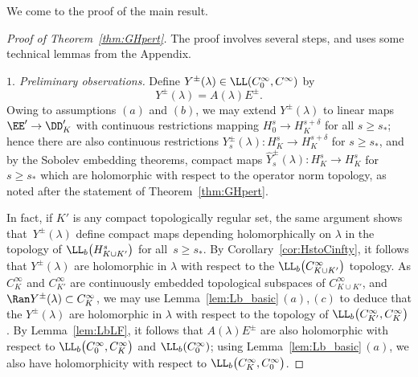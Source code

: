 We come to the proof of the main result.
 \begin{proof}[Proof of Theorem~\ref{thm:GHpert}] The proof involves several steps, and uses some technical lemmas from the Appendix.
 	
 	\emph{$1.$ Preliminary observations.} Define $Y^\pm(\lambda)\in\LL(C_0^\infty,C^\infty)$ by
 	\begin{equation*}
 		Y^\pm(\lambda)=A(\lambda)E^\pm.
 	\end{equation*}
 	Owing to assumptions $(a)$ and $(b)$, we may extend $Y^\pm(\lambda)$ to linear maps $\EE'\to\DD'_K$ with continuous restrictions mapping $H^s_0\to H^{s+\delta}_K$ for all $s\ge s_*$; hence there are also continuous restrictions $Y_s^\pm(\lambda)\colon H^s_K\to H^{s+\delta}_K$ for $s\ge s_*$,
 	and by the Sobolev embedding theorems, compact maps $\hat{Y}^\pm_s(\lambda)\colon H^s_K\to H^{s}_K$ for $s\ge s_*$ which are holomorphic with respect to the operator norm topology, as noted after the statement of Theorem~\ref{thm:GHpert}.
 	
 	In fact, if $K'$ is any compact topologically regular set, the same argument shows that~$Y^\pm(\lambda)$
 define compact maps depending holomorphically on $\lambda$ in the topology of
 	$\LL_b\big(H^s_{K\cup K'}\big)$ for all~${s\!\ge\!s_*}$. By Corollary~\ref{cor:HstoCinfty}, it follows that
 	$Y^\pm(\lambda)$ are holomorphic in $\lambda$ with respect to the $\LL_b\big(C^\infty_{K\cup K'}\big)$ topology.
 	As $C^\infty_K$ and $C^\infty_{K'}$ are continuously embedded topological subspaces of $C^\infty_{K\cup K'}$, and $\Ran Y^\pm(\lambda)\subset C^\infty_K$, we may use Lemma~\ref{lem:Lb_basic}\,$(a)$,\,$(c)$ to deduce that
 	the $Y^\pm(\lambda)$ are holomorphic in $\lambda$ with respect to the
 	topology of $\LL_b\big(C^\infty_{K'},C^\infty_{K}\big)$.
 	By Lemma~\ref{lem:LbLF}, it follows that
 	$A(\lambda)E^\pm$ are also holomorphic with respect to $\LL_b\big(C_0^\infty,C^\infty_K\big)$ and $\LL_b(C_0^\infty)$; using Lemma~\ref{lem:Lb_basic}\,$(a)$, we also have holomorphicity with respect to
 	$\LL_b\big(C^\infty_K,C_0^\infty\big)$.
 	

\end{proof}
